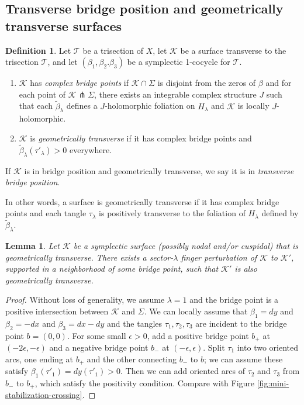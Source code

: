 \documentclass[11pt]{amsart}
\newtheorem{lemma}[theorem]{Lemma}
\theoremstyle{definition}
\newtheorem{definition}[theorem]{Definition}
\theoremstyle{remark}
\numberwithin{equation}{section}
\newcommand{\betat}{\widetilde{\beta}}
\newcommand{\cT}{\mathcal{T}}
\newcommand{\cK}{\mathcal{K}}
\begin{document}
\subsection{Transverse bridge position and geometrically transverse surfaces}

\begin{definition}
\label{def:transverse-bridge}
Let $\cT$ be a trisection of $X$, let $\cK$ be a surface transverse to the trisection $\cT$, and let $(\beta_1,\beta_2.\beta_3)$ be a symplectic 1-cocycle for $\cT$.  \begin{enumerate}
    \item $\cK$ has {\it complex bridge points} if $\cK \cap \Sigma$ is disjoint from the zeros of $\beta$ and for each point of $\cK \pitchfork \Sigma$, there exists an integrable complex structure $J$ such that each $\betat_{\lambda}$ defines a $J$-holomorphic foliation on $H_{\lambda}$ and $\cK$ is locally $J$-holomorphic.
    \item $\cK$ is {\it geometrically transverse} if it has complex bridge points and $\betat_{\lambda}(\tau'_{\lambda}) > 0$ everywhere.
\end{enumerate}
If $\cK$ is in bridge position and geometrically transverse, we say it is in {\it transverse bridge position}.
\end{definition}
In other words, a surface is geometrically transverse if it has complex bridge points and each tangle $\tau_{\lambda}$ is positively transverse to the foliation of $H_{\lambda}$ defined by $\betat_{\lambda}$.

\begin{lemma}
Let $\cK$ be a symplectic surface (possibly nodal and/or cuspidal) that is geometrically transverse.  There exists a sector-$\lambda$ finger perturbation of $\cK$ to $\cK'$, supported in a neighborhood of some bridge point, such that $\cK'$ is also geometrically transverse.
\end{lemma}

\begin{proof}
Without loss of generality, we assume $\lambda = 1$ and the bridge point is a positive intersection between $\cK$ and $\Sigma$.  We can locally assume that $\beta_1 = dy$ and $\beta_2 = -dx$ and $\beta_3 = dx - dy$ and the tangles $\tau_1,\tau_2,\tau_3$ are incident to the bridge point $b = (0,0)$.  For some small $\epsilon > 0$, add a positive bridge point $b_+$ at $(-2\epsilon,-\epsilon)$ and a negative bridge point $b_-$ at $(-\epsilon,\epsilon)$.  Split $\tau_1$ into two oriented arcs, one ending at $b_+$ and the other connecting $b_-$ to $b$; we can assume these satisfy $\beta_1(\tau'_1) = dy(\tau'_1) > 0$.  Then we can add oriented arcs of $\tau_2$ and $\tau_3$ from $b_-$ to $b_+$, which satisfy the positivity condition.  Compare with Figure \ref{fig:mini-stabilization-crossing}.
\end{proof}
\end{document}
